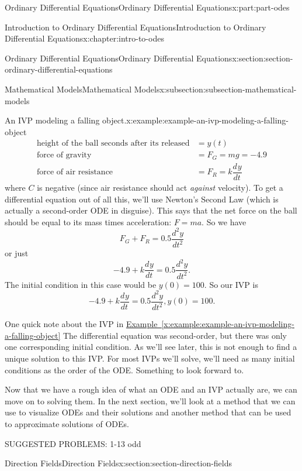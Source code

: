 \documentclass[oneside,10pt,]{book}
\newcommand{\xreffont}{\relax}
\numberwithin{equation}{part}
\newcommand{\dv}[3][]{\dfrac{d^{#1} #2}{d #3^{#1}}}
\begin{document}
\begin{partptx}{Ordinary Differential Equations}{}{Ordinary Differential Equations}{}{}{x:part:part-odes}
\begin{chapterptx}{Introduction to Ordinary Differential Equations}{}{Introduction to Ordinary Differential Equations}{}{}{x:chapter:intro-to-odes}
\begin{sectionptx}{Ordinary Differential Equations}{}{Ordinary Differential Equations}{}{}{x:section:section-ordinary-differential-equations}
\begin{subsectionptx}{Mathematical Models}{}{Mathematical Models}{}{}{x:subsection:subsection-mathematical-models}
\begin{example}{An IVP modeling a falling object.}{x:example:example-an-ivp-modeling-a-falling-object}
\begin{align*}
\text{height of the ball  seconds after its released} &= y(t) \\
\text{force of gravity} &= F_{G} = mg = -4.9\\
\text{force of air resistance} &= F_{R} = k\dv{y}{t} 
\end{align*}
where \(C\) is negative (since air resistance should act \emph{against} velocity). To get a differential equation out of all this, we'll use Newton's Second Law (which is actually a second-order ODE in disguise). This says that the net force on the ball should be equal to its mass times acceleration: \(F = ma\). So we have%
\begin{equation*}
F_{G}+F_{R} = 0.5\dv[2]{y}{t}
\end{equation*}
or just%
\begin{equation*}
-4.9+k\dv{y}{t} = 0.5\dv[2]{y}{t}.
\end{equation*}
The initial condition in this case would be \(y(0) = 100\). So our IVP is%
\begin{equation*}
-4.9+k\dv{y}{t} = 0.5\dv[2]{y}{t}, y(0) = 100.
\end{equation*}
%
\end{example}
One quick note about the IVP in \hyperref[x:example:example-an-ivp-modeling-a-falling-object]{Example~{\xreffont\ref{x:example:example-an-ivp-modeling-a-falling-object}}} The differential equation was second-order, but there was only one corresponding initial condition. As we'll see later, this is not enough to find a unique solution to this IVP. For most IVPs we'll solve, we'll need as many initial conditions as the order of the ODE. Something to look forward to.%
\end{subsectionptx}
\begin{conclusion}{}%
Now that we have a rough idea of what an ODE and an IVP actually are, we can move on to solving them. In the next section, we'll look at a method that we can use to visualize ODEs and their solutions and another method that can be used to approximate solutions of ODEs.%
\par
SUGGESTED PROBLEMS: 1-13 odd%
\end{conclusion}%
\end{sectionptx}
%
%
\typeout{************************************************}
\typeout{************************************************}
%
\begin{sectionptx}{Direction Fields}{}{Direction Fields}{}{}{x:section:section-direction-fields}
\begin{introduction}{}%

\end{introduction}
\end{sectionptx}
\end{chapterptx}
\end{partptx}
\end{document}
